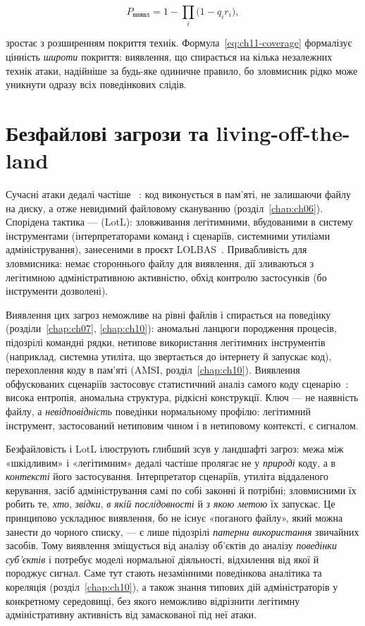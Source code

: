 \begin{equation}
P_{\text{виявл}} = 1 - \prod_{i}\bigl(1 - q_i r_i\bigr),
\label{eq:ch11-coverage}
\end{equation}

зростає з розширенням покриття технік. Формула~\eqref{eq:ch11-coverage} формалізує цінність \emph{широти} покриття: виявлення, що спирається на кілька незалежних технік атаки, надійніше за будь-яке одиничне правило, бо зловмисник рідко може уникнути одразу всіх поведінкових слідів.

\section{Безфайлові загрози та living-off-the-land}\label{sec:ch11-fileless}

Сучасні атаки дедалі частіше ~\cite{ch11:fileless}: код виконується в пам'яті, не залишаючи файлу на диску, а отже невидимий файловому скануванню (розділ~\ref{chap:ch06}). Спорідена тактика ---  (LotL): зловживання легітимними, вбудованими в систему інструментами (інтерпретаторами команд і сценаріїв, системними утиліами адміністрування), занесеними в проєкт LOLBAS~\cite{ch11:lolbas}. Привабливість для зловмисника: немає стороннього файлу для виявлення, дії зливаються з легітимною адміністративною активністю, обхід контролю застосунків (бо інструменти дозволені).

Виявлення цих загроз неможливе на рівні файлів і спирається на поведінку (розділи~\ref{chap:ch07}, \ref{chap:ch10}): аномальні ланцюги породження процесів, підозрілі командні рядки, нетипове використання легітимних інструментів (наприклад, системна утиліта, що звертається до інтернету й запускає код), перехоплення коду в пам'яті (AMSI, розділ~\ref{chap:ch10}). Виявлення обфускованих сценаріїв застосовує статистичний аналіз самого коду сценарію~\cite{ch11:powershell}: висока ентропія, аномальна структура, рідкісні конструкції. Ключ --- не наявність файлу, а \emph{невідповідність} поведінки нормальному профілю: легітимний інструмент, застосований нетиповим чином і в нетиповому контексті, є сигналом.

Безфайловість і LotL ілюструють глибший зсув у ландшафті загроз: межа між «шкідливим» і «легітимним» дедалі частіше пролягає не у \emph{природі} коду, а в \emph{контексті} його застосування. Інтерпретатор сценаріїв, утиліта віддаленого керування, засіб адміністрування самі по собі законні й потрібні; зловмисними їх робить те, \emph{хто}, \emph{звідки}, \emph{в якій послідовності} й \emph{з якою метою} їх запускає. Це принципово ускладнює виявлення, бо не існує «поганого файлу», який можна занести до чорного списку, --- є лише підозрілі \emph{патерни використання} звичайних засобів. Тому виявлення зміщується від аналізу об'єктів до аналізу \emph{поведінки суб'єктів} і потребує моделі нормальної діяльності, відхилення від якої й породжує сигнал. Саме тут стають незамінними поведінкова аналітика та кореляція (розділ~\ref{chap:ch10}), а також знання типових дій адміністраторів у конкретному середовищі, без якого неможливо відрізнити легітимну адміністративну активність від замаскованої під неї атаки.

